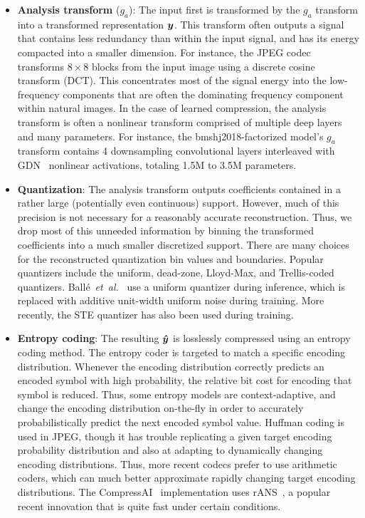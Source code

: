 \begin{itemize}
  \item \textbf{Analysis transform} ($g_a$):
    The input first is transformed by the $g_a$ transform into a transformed representation ${\boldsymbol{y}}$.
    This transform often outputs a signal that contains less redundancy than within the input signal, and has its energy compacted into a smaller dimension.
    For instance, the JPEG codec transforms $8 \times 8$ blocks from the input image using a discrete cosine transform (DCT).
    This concentrates most of the signal energy into the low-frequency components that are often the dominating frequency component within natural images.
    In the case of learned compression, the analysis transform is often a nonlinear transform comprised of multiple deep layers and many parameters.
    For instance, the bmshj2018-factorized model's $g_a$ transform contains 4 downsampling convolutional layers interleaved with GDN~\cite{balle2016gdn} nonlinear activations, totaling 1.5M to 3.5M parameters.

  \item \textbf{Quantization}:
    The analysis transform outputs coefficients contained in a rather large (potentially even continuous) support.
    However, much of this precision is not necessary for a reasonably accurate reconstruction.
    Thus, we drop most of this unneeded information by binning the transformed coefficients into a much smaller discretized support.
    There are many choices for the reconstructed quantization bin values and boundaries.
    Popular quantizers include the uniform, dead-zone, Lloyd-Max, and Trellis-coded quantizers.
    Ballé~\emph{et~al.}~\cite{balle2018variational} use a uniform quantizer during inference, which is replaced with additive unit-width uniform noise during training.
    More recently, the STE quantizer has also been used during training.

  \item \textbf{Entropy coding}:
    The resulting ${\boldsymbol{\hat{y}}}$ is losslessly compressed using an entropy coding method.
    The entropy coder is targeted to match a specific encoding distribution.
    Whenever the encoding distribution correctly predicts an encoded symbol with high probability, the relative bit cost for encoding that symbol is reduced.
    Thus, some entropy models are context-adaptive, and change the encoding distribution on-the-fly in order to accurately probabilistically predict the next encoded symbol value.
    Huffman coding is used in JPEG, though it has trouble replicating a given target encoding probability distribution and also at adapting to dynamically changing encoding distributions.
    Thus, more recent codecs prefer to use arithmetic coders, which can much better approximate rapidly changing target encoding distributions.
    The CompressAI~\cite{begaint2020compressai} implementation uses rANS~\cite{duda2013asymmetric,giesen2014ryg_rans}, a popular recent innovation that is quite fast under certain conditions.


\end{itemize}
